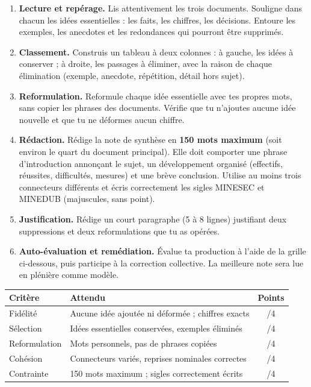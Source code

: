 \documentclass[11pt]{article}
\newcommand{\cle}[1]{{\popxbold\color{popdark}#1}}
\begin{document}
\begin{enumerate}
\item \textbf{Lecture et repérage.} Lis attentivement les trois documents. Souligne dans chacun les idées essentielles : les faits, les chiffres, les décisions. Entoure les exemples, les anecdotes et les redondances qui pourront être supprimés.
\item \textbf{Classement.} Construis un tableau à deux colonnes : à gauche, les idées à conserver ; à droite, les passages à éliminer, avec la raison de chaque élimination (exemple, anecdote, répétition, détail hors sujet).
\item \textbf{Reformulation.} Reformule chaque idée essentielle avec tes propres mots, sans copier les phrases des documents. Vérifie que tu n'ajoutes aucune idée nouvelle et que tu ne déformes aucun chiffre.
\item \textbf{Rédaction.} Rédige la note de synthèse en \textbf{150 mots maximum} (soit environ le quart du document principal). Elle doit comporter une phrase d'introduction annonçant le sujet, un développement organisé (effectifs, réussites, difficultés, mesures) et une brève conclusion. Utilise au moins trois \cle{connecteurs} différents et écris correctement les sigles MINESEC et MINEDUB (majuscules, sans point).
\item \textbf{Justification.} Rédige un court paragraphe (5 à 8 lignes) justifiant deux suppressions et deux reformulations que tu as opérées.
\item \textbf{Auto-évaluation et remédiation.} Évalue ta production à l'aide de la grille ci-dessous, puis participe à la correction collective. La meilleure note sera lue en plénière comme modèle.
\end{enumerate}

\begin{center}
\begin{tabularx}{\linewidth}{|l|X|c|}\hline
\rowcolor{popblueL} \textbf{Critère} & \textbf{Attendu} & \textbf{Points} \\ \hline
Fidélité & Aucune idée ajoutée ni déformée ; chiffres exacts & /4 \\ \hline
Sélection & Idées essentielles conservées, exemples éliminés & /4 \\ \hline
Reformulation & Mots personnels, pas de phrases copiées & /4 \\ \hline
Cohésion & Connecteurs variés, reprises nominales correctes & /4 \\ \hline
Contrainte & 150 mots maximum ; sigles correctement écrits & /4 \\ \hline
\end{tabularx}
\end{center}
\end{document}
